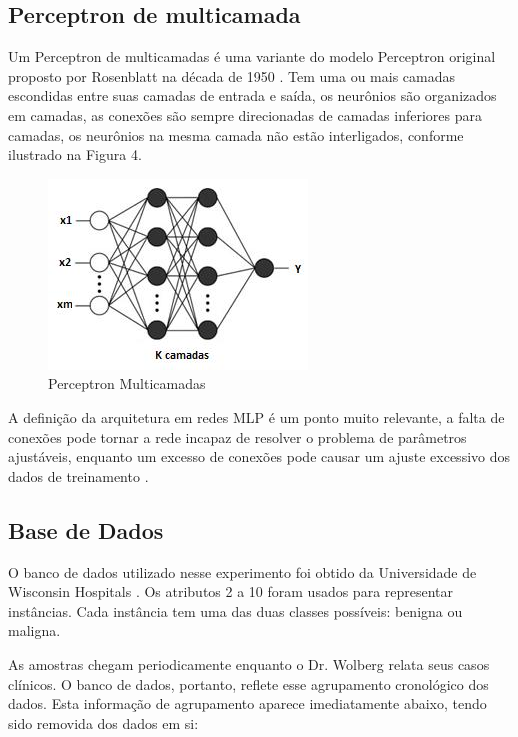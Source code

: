 \documentclass[conference]{IEEEtran}
\begin{document}
    \subsection{Perceptron de multicamada}
    Um Perceptron de multicamadas é uma variante do modelo Perceptron original proposto por Rosenblatt na década de 1950 \cite{b9}. Tem uma ou mais camadas escondidas entre suas camadas de entrada e saída, os neurônios são organizados em camadas, as conexões são sempre direcionadas de camadas inferiores para camadas, os neurônios na mesma camada não estão interligados, conforme ilustrado na Figura 4.
    
    \begin{figure}[htbp]
	\centerline{\includegraphics[scale=0.9]{Perceptron-Multicamadas.png}}
	\caption{Perceptron Multicamadas}
	\label{fig}
	\end{figure}
    
    A definição da arquitetura em redes MLP é um ponto muito relevante, a falta de conexões pode tornar a rede incapaz de resolver o problema de parâmetros ajustáveis, enquanto um excesso de conexões pode causar um ajuste excessivo dos dados de treinamento \cite{b7}.

    \subsection{Base de Dados}

O banco de dados utilizado nesse experimento foi obtido da Universidade de Wisconsin Hospitals \cite{b10} \cite{b11}. Os atributos 2 a 10 foram usados para representar instâncias. Cada instância tem uma das duas classes possíveis: benigna ou maligna.
    
    As amostras chegam periodicamente enquanto o Dr. Wolberg relata seus casos clínicos.
   O banco de dados, portanto, reflete esse agrupamento cronológico dos dados.
   Esta informação de agrupamento aparece imediatamente abaixo, tendo sido removida
   dos dados em si:
\end{document}
